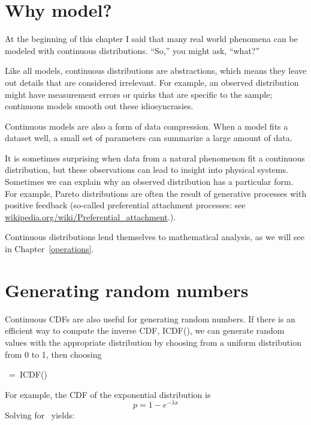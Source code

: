 \documentclass[12pt]{book}
\begin{document}
\section{Why model?}

At the beginning of this chapter I said that many real world phenomena
can be modeled with continuous distributions.  ``So,'' you might ask,
``what?''

Like all models, continuous distributions are abstractions, which
means they leave out details that are considered irrelevant.
For example, an observed distribution might have measurement errors
or quirks that are specific to the sample; continuous models smooth
out these idiosyncrasies.

Continuous models are also a form of data compression.  When a model
fits a dataset well, a small set of parameters can summarize a
large amount of data.

It is sometimes surprising when data from a natural phenomenon fit a
continuous distribution, but these observations can lead to insight
into physical systems.  Sometimes we can explain why an observed
distribution has a particular form.  For example, Pareto distributions
are often the result of generative processes with positive feedback
(so-called preferential attachment processes: see
\url{wikipedia.org/wiki/Preferential_attachment}.).

Continuous distributions lend themselves to mathematical analysis, as
we will see in Chapter~\ref{operations}.


\section{Generating random numbers}

Continuous CDFs are also useful for generating random numbers.
If there is an efficient way to compute the inverse CDF, ICDF(\p),
we can generate random values with the appropriate distribution
by choosing from a uniform distribution from 0 to 1, then choosing

\quad \x~=~ICDF(\p)

For example, the CDF of the exponential distribution is
%
\[ p = 1 - e^{-\lambda x} \]
%
Solving for \x~yields:
\end{document}
